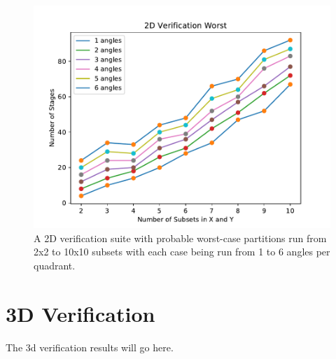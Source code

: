 \begin{figure}[H]
\centering
\includegraphics[scale=0.8]{../figures/worst_verification.pdf}
\caption{A 2D verification suite with probable worst-case partitions run from 2x2 to 10x10 subsets with each case being run from 1 to 6 angles per quadrant.}
\label{worst_verification}
\end{figure}

\section{3D Verification}

The 3d verification results will go here.

